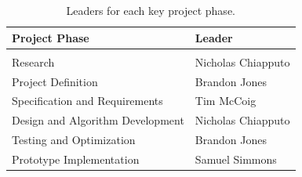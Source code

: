 \documentclass[11pt]{IEEEtran}
\begin{document}
			\begin{table}[tb]
				\centering
				\begin{tabularx}{\linewidth}{l|l}
					Project Phase 						& Leader \\
					\hline
					\vspace{-0.1in}						& \\
					Research 							& Nicholas Chiapputo \\
					Project Definition					& Brandon Jones \\
					Specification and Requirements 		& Tim McCoig \\
					Design and Algorithm Development 	& Nicholas Chiapputo \\
					Testing and Optimization 			& Brandon Jones \\
					Prototype Implementation 			& Samuel Simmons
				\end{tabularx}
				\caption{Leaders for each key project phase.}
				\label{tab:phaseLeaders}
			\end{table}
\end{document}
